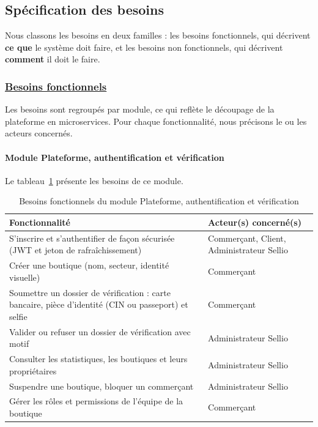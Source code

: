\subsection{Spécification des besoins}
Nous classons les besoins en deux familles : les besoins fonctionnels, qui décrivent \textbf{ce que} le système doit faire, et les besoins non fonctionnels, qui décrivent \textbf{comment} il doit le faire.
\subsubsection*{\underline{\textbf{Besoins fonctionnels}}}
Les besoins sont regroupés par module, ce qui reflète le découpage de la plateforme en microservices. Pour chaque fonctionnalité, nous précisons le ou les acteurs concernés.

\paragraph{Module Plateforme, authentification et vérification}
Le tableau~\ref{tab:besoins-plateforme} présente les besoins de ce module.
\begin{table}[H]
\centering
\renewcommand{\arraystretch}{1.3}
\begin{tabular}{|p{9.5cm}|p{5.5cm}|}
\hline
\textbf{Fonctionnalité} & \textbf{Acteur(s) concerné(s)} \\
\hline
S'inscrire et s'authentifier de façon sécurisée (JWT et jeton de rafraîchissement) & Commerçant, Client, Administrateur Sellio \\
\hline
Créer une boutique (nom, secteur, identité visuelle) & Commerçant \\
\hline
Soumettre un dossier de vérification : carte bancaire, pièce d'identité (CIN ou passeport) et selfie & Commerçant \\
\hline
Valider ou refuser un dossier de vérification avec motif & Administrateur Sellio \\
\hline
Consulter les statistiques, les boutiques et leurs propriétaires & Administrateur Sellio \\
\hline
Suspendre une boutique, bloquer un commerçant & Administrateur Sellio \\
\hline
Gérer les rôles et permissions de l'équipe de la boutique & Commerçant \\
\hline
\end{tabular}
\caption{Besoins fonctionnels du module Plateforme, authentification et vérification}
\label{tab:besoins-plateforme}
\end{table}

